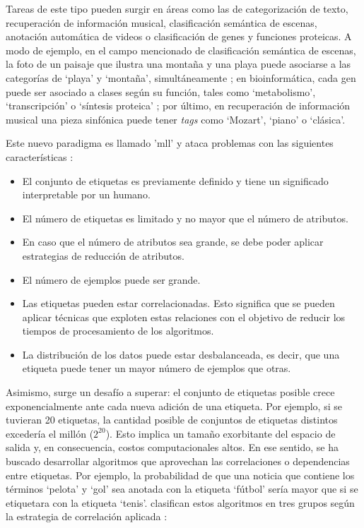Tareas de este tipo pueden surgir en áreas como las de categorización de texto,
recuperación de información musical, clasificación semántica de escenas,
anotación automática de videos o  clasificación de genes y funciones proteicas.
A modo de ejemplo, en el campo mencionado de clasificación semántica de escenas,
la foto de un paisaje que ilustra una montaña y una playa puede asociarse a las
categorías de ‘playa’ y ‘montaña’, simultáneamente \cite{gibaja_tutorial_2015};
en bioinformática, cada gen puede ser asociado a clases según su función, tales
como ‘metabolismo’, ‘transcripción’ o ‘síntesis proteica’
\cite{zhang_multi-label_2010}; por último, en recuperación de información
musical una pieza sinfónica puede tener \textit{tags} como ‘Mozart’, ‘piano’ o
‘clásica’.

Este nuevo paradigma es llamado '\acrlong{mll}'   y ataca problemas con las
siguientes características \cite{gibaja_tutorial_2015}: 

\begin{itemize} 

   \item El conjunto de etiquetas es previamente definido y tiene un significado
      interpretable por un humano.  

   \item El número de etiquetas es limitado y no mayor que el número de
      atributos. 

   \item En caso que el número de atributos sea grande, se debe poder aplicar
      estrategias de reducción de atributos.

   \item El número de ejemplos puede ser grande.  

   \item Las etiquetas pueden estar correlacionadas. Esto significa que se
      pueden aplicar técnicas que exploten estas relaciones con el objetivo de
      reducir los tiempos de procesamiento de los algoritmos.  

   \item La distribución de los datos puede estar desbalanceada, es decir, que
      una etiqueta puede tener un mayor número de ejemplos que otras. 

\end{itemize}

Asimismo, surge un desafío a superar: el conjunto de etiquetas posible crece
exponencialmente ante cada nueva adición de una etiqueta. Por ejemplo, si se
tuvieran 20 etiquetas, la cantidad posible de conjuntos de etiquetas distintos
excedería el millón (\(2^{20}\)). Esto implica un tamaño exorbitante del espacio
de salida y, en consecuencia, costos computacionales altos. En ese sentido, se
ha buscado desarrollar algoritmos que aprovechan las correlaciones o
dependencias entre etiquetas. Por ejemplo, la probabilidad de que una noticia
que contiene los términos ‘pelota’ y ‘gol’ sea anotada con la etiqueta ‘fútbol’
sería mayor que si se etiquetara con la etiqueta ‘tenis’.
\citeauthor{zhang_multi-label_2010} clasifican estos algoritmos en tres grupos
según la estrategia de correlación aplicada \cite{zhang_multi-label_2010}:

